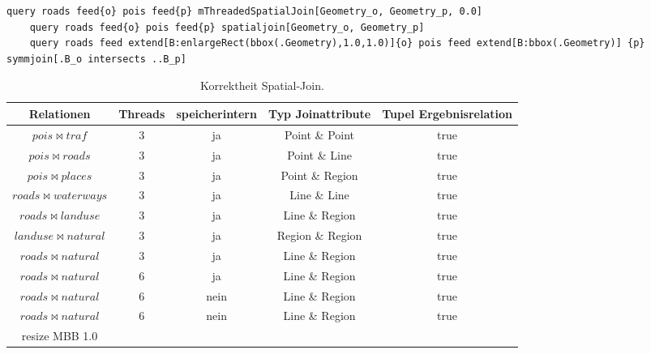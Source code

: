\documentclass[a4paper,12pt,twoside]{article}
\newcommand{\Fb}[1]{\textit{#1}} %
\begin{document}
\begin{minipage}{0.95\textwidth}
	\begin{lstlisting}[caption={Beispiel Testqueries für den Spatial-Join-Operator ohne \Fb{project} und \Fb{sortby}.}, label=list:testspatialjoin]
	query roads feed{o} pois feed{p} mThreadedSpatialJoin[Geometry_o, Geometry_p, 0.0]
	query roads feed{o} pois feed{p} spatialjoin[Geometry_o, Geometry_p]
	query roads feed extend[B:enlargeRect(bbox(.Geometry),1.0,1.0)]{o} pois feed extend[B:bbox(.Geometry)] {p} symmjoin[.B_o intersects ..B_p]
	\end{lstlisting}
\end{minipage}


\begin{table}
	\centering
	\begin{tabular}{|c|c|c|c|c|}
		\hline
		\rowcolor{gray!30} 
		Relationen & Threads & speicherintern & Typ Joinattribute & Tupel Ergebnisrelation \\ 
		\hline 
		$pois \bowtie traf$ & 3 & ja & Point \& Point & true \\ 
		\hline 
		$pois \bowtie roads$ & 3 & ja & Point \& Line & true \\ 
		\hline
		$pois \bowtie places$ & 3 & ja & Point \& Region & true \\ 
		\hline
		$roads \bowtie waterways$ & 3 & ja & Line \& Line & true \\ 
		\hline
		$roads \bowtie landuse$ & 3 & ja & Line \& Region & true \\ 
		\hline
		$landuse \bowtie natural$ & 3 & ja & Region \& Region & true \\ 
		\hline
		$roads \bowtie natural$ & 3 & ja & Line \& Region & true \\ 
		\hline
		$roads \bowtie natural$ & 6 & ja & Line \& Region & true \\ 
		\hline
		$roads \bowtie natural$ & 6 & nein & Line \& Region & true \\ 
		\hline
		$roads \bowtie natural$ & 6 & nein & Line \& Region & true \\ 
		resize MBB 1.0 &  &  &  &  \\ 
		\hline
	\end{tabular}
	\caption{\label{tab:testSpatial}Korrektheit Spatial-Join.}
\end{table}
 
\end{document}
